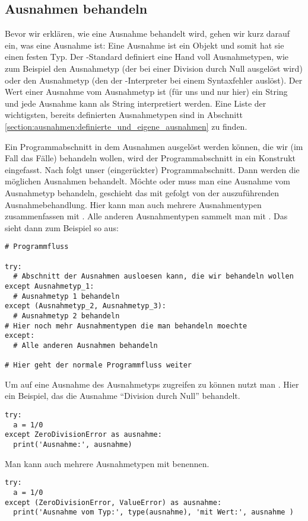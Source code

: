 \subsection{Ausnahmen behandeln}
\label{section:ausnahmen:ausnahmen_behandeln}
Bevor wir erklären, wie eine Ausnahme behandelt wird, gehen wir kurz darauf ein, was eine Ausnahme ist:
Eine Ausnahme ist ein Objekt und somit hat sie einen festen Typ.
Der \Python-Standard definiert eine Hand voll Ausnahmetypen, wie zum Beispiel
den Ausnahmetyp  (der bei einer Division durch Null ausgelöst wird) oder
den Ausnahmetyp  (den der \Python-Interpreter bei einem Syntaxfehler auslöst).
Der Wert einer Ausnahme  vom Ausnahmetyp  ist (für uns und nur hier) ein String und jede Ausnahme kann als String interpretiert werden.
Eine Liste der wichtigsten, bereits definierten Ausnahmetypen sind in Abschnitt \ref{section:ausnahmen:definierte_und_eigene_ausnahmen} zu finden.

Ein Programmabschnitt in dem Ausnahmen ausgelöst werden können, die wir (im Fall das Fälle) behandeln wollen,
wird der Programmabschnitt in ein  Konstrukt eingefasst.
Nach  folgt unser (eingerückter) Programmabschnitt.
Dann werden die möglichen Ausnahmen behandelt.
Möchte oder muss man eine Ausnahme vom Ausnahmetyp  behandeln, geschieht das mit  gefolgt von der auszuführenden Ausnahmebehandlung.
Hier kann man auch mehrere Ausnahmentypen zusammenfassen mit .
Alle anderen Ausnahmentypen sammelt man mit .
Das sieht dann zum Beispiel so aus:
\begin{lstlisting}
# Programmfluss

try:
  # Abschnitt der Ausnahmen ausloesen kann, die wir behandeln wollen
except Ausnahmetyp_1:
  # Ausnahmetyp 1 behandeln
except (Ausnahmetyp_2, Ausnahmetyp_3):
  # Ausnahmetyp 2 behandeln
# Hier noch mehr Ausnahmentypen die man behandeln moechte
except:
  # Alle anderen Ausnahmen behandeln

# Hier geht der normale Programmfluss weiter
\end{lstlisting}

Um auf eine Ausnahme des Ausnahmetyps  zugreifen zu können nutzt man .
Hier ein Beispiel, das die Ausnahme ``Division durch Null'' behandelt.
\begin{lstlisting}
try:
  a = 1/0
except ZeroDivisionError as ausnahme:
  print('Ausnahme:', ausnahme)
\end{lstlisting}
Man kann auch mehrere Ausnahmetypen mit  benennen.
\begin{lstlisting}
try:
  a = 1/0
except (ZeroDivisionError, ValueError) as ausnahme:
  print('Ausnahme vom Typ:', type(ausnahme), 'mit Wert:', ausnahme )
\end{lstlisting}

